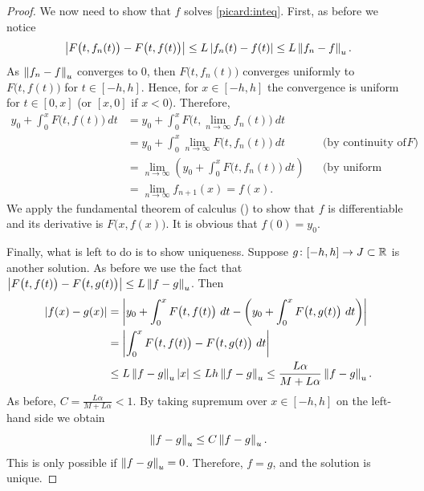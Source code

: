 \begin{proof}
We now need to show that $f$ solves \eqref{picard:inteq}.
First, as before we notice
\begin{equation*}
\left\lvert {F\bigl(t,f_{n}(t)\bigr) - 
F\bigl(t,f(t)\bigr)} \right\rvert
\leq
L \left\lvert {f_n(t)-f(t)} \right\rvert
\leq
L \left\lVert {f_n-f} \right\rVert_u .
\end{equation*}
As $\left\lVert {f_n-f} \right\rVert_u$ converges to 0, then
$F\bigl(t,f_n(t)\bigr)$ converges uniformly to $F\bigl(t,f(t)\bigr)$
for $t \in [-h,h]$.  Hence, for $x \in [-h,h]$
the convergence is uniform %
for $t \in [0,x]$ (or $[x,0]$ if $x < 0$).  Therefore,
\begin{align*}
y_0
+
\int_0^{x}
F(t,f(t)\bigr)~dt
& =
y_0
+
\int_0^{x}
F\bigl(t,\lim_{n\to\infty} f_n(t)\bigr)~dt
& &
\\
& =
y_0
+
\int_0^{x}
\lim_{n\to\infty} F\bigl(t,f_n(t)\bigr)~dt
& & \text{(by continuity of } F\text{)}
\\
& =
\lim_{n\to\infty} 
\left(
y_0
+
\int_0^{x}
F\bigl(t,f_n(t)\bigr)~dt
\right)
& & \text{(by uniform convergence)}
\\
& =
\lim_{n\to\infty} 
f_{n+1}(x)
=
f(x) .
& &
\end{align*}
We apply the fundamental theorem of calculus () to show that
$f$ is differentiable and its derivative is $F\bigl(x,f(x)\bigr)$.  It is obvious
that $f(0) = y_0$.

Finally, what is left to do is to show uniqueness.  Suppose $g \colon [-h,h]
\to J \subset {\mathbb{R}}$ is another solution.
As before we use the fact that
$\left\lvert {F\bigl(t,f(t)\bigr) - F\bigl(t,g(t)\bigr)} \right\rvert \leq L \left\lVert {f-g} \right\rVert_u$.
Then
\begin{equation*}
\begin{split}
\left\lvert {f(x)-g(x)} \right\rvert
& =
\left\lvert {
y_0
+
\int_0^{x}
F\bigl(t,f(t)\bigr)~dt
-
\left(
y_0
+
\int_0^{x}
F\bigl(t,g(t)\bigr)~dt
\right)
} \right\rvert
\\
& =
\left\lvert {
\int_0^{x}
F\bigl(t,f(t)\bigr)
-
F\bigl(t,g(t)\bigr)~dt
} \right\rvert
\\
& \leq
L\left\lVert {f-g} \right\rVert_u\left\lvert {x} \right\rvert
\leq
Lh\left\lVert {f-g} \right\rVert_u
\leq
\frac{L\alpha}{M+L\alpha}\left\lVert {f-g} \right\rVert_u .
\end{split}
\end{equation*}
As 
before, $C = \frac{L\alpha}{M+L\alpha} < 1$.  By taking supremum over $x \in
[-h,h]$ on the
left-hand side we obtain
\begin{equation*}
\left\lVert {f-g} \right\rVert_u \leq C \left\lVert {f-g} \right\rVert_u .
\end{equation*}
This is only possible if $\left\lVert {f-g} \right\rVert_u = 0$.  Therefore, $f=g$, and the
solution is unique.
\end{proof}

